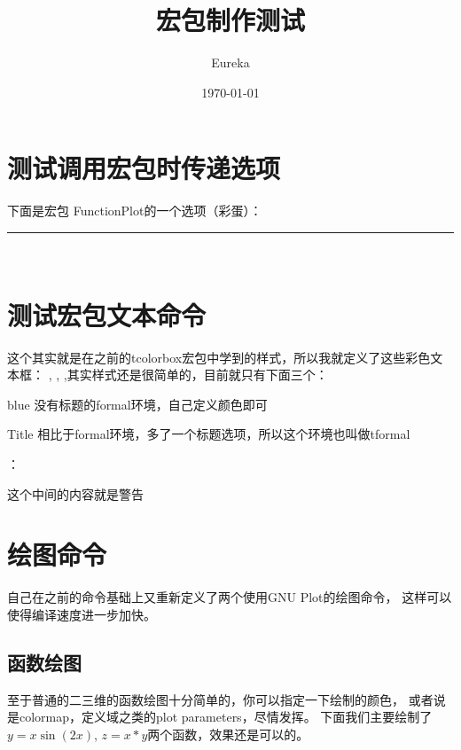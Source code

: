 \documentclass[12pt]{article}
\title{宏包制作测试}
\author{Eureka}
\date{\today}
\begin{document}
\maketitle

\section{测试调用宏包时传递选项}
下面是宏包 {\ttfamily FunctionPlot}的一个选项（彩蛋）：

\noindent\rule{.9\linewidth}{2pt}\\
\test


\section{测试宏包文本命令}
这个其实就是在之前的tcolorbox宏包中学到的样式，所以我就定义了这些彩色文本框： 
,\; ,\; ,其实样式还是很简单的，目前就只有下面三个：
\begin{formal}{blue}
    没有标题的formal环境，自己定义颜色即可
\end{formal}

\begin{tformal}[blue]{Title}
    相比于formal环境，多了一个标题选项，所以这个环境也叫做tformal
\end{tformal}：

\begin{warning}
这个中间的内容就是警告
\end{warning}

\section{绘图命令}
自己在之前的命令基础上又重新定义了两个使用GNU Plot的绘图命令，
这样可以使得编译速度进一步加快。

\subsection{函数绘图}
至于普通的二三维的函数绘图十分简单的，你可以指定一下绘制的颜色，
或者说是colormap，定义域之类的plot parameters，尽情发挥。
下面我们主要绘制了 $y=x\sin(2x)$, $z=x*y$两个函数，效果还是可以的。

\begin{center}

\end{center}
\end{document}
